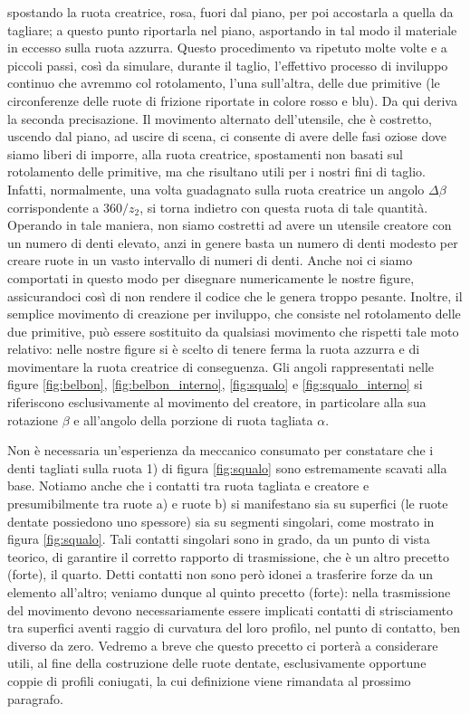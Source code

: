 spostando la ruota creatrice, rosa, fuori dal piano,
per poi accostarla a quella da tagliare; a questo punto
riportarla nel piano, asportando in tal modo il materiale in eccesso
sulla ruota azzurra. Questo procedimento va ripetuto molte volte e a 
piccoli passi, cos\`i da simulare, durante il taglio, l'effettivo
processo di inviluppo continuo che avremmo col rotolamento, l'una
sull'altra, delle due primitive (le circonferenze delle ruote di frizione
riportate in colore rosso e blu). Da qui deriva la seconda precisazione.
Il movimento alternato dell'utensile, che \`e costretto,
uscendo dal piano, ad uscire di scena,
ci consente di avere delle fasi oziose dove siamo
liberi di imporre, alla ruota creatrice, spostamenti non basati sul
rotolamento delle primitive, ma che risultano utili per i nostri fini di taglio.
Infatti, normalmente, una volta guadagnato sulla
ruota creatrice un angolo $\Delta \beta$
corrispondente a $360 /z_2$, si torna indietro con questa 
ruota di tale quantit\`a. Operando in tale maniera, non siamo
costretti ad avere un utensile creatore con un numero di denti elevato,
anzi in genere basta un numero di denti modesto per creare ruote in
un vasto intervallo di numeri di denti. Anche noi ci siamo comportati
in questo modo per disegnare numericamente le nostre figure,
assicurandoci cos\`i di non rendere il codice
che le genera troppo pesante. Inoltre, il semplice movimento di creazione
per inviluppo, che consiste nel rotolamento delle due primitive, pu\`o
essere sostituito da qualsiasi movimento che rispetti tale moto relativo:
nelle nostre figure si \`e scelto di tenere ferma la ruota azzurra e di
movimentare la ruota creatrice di conseguenza. Gli angoli rappresentati
nelle figure \ref{fig:belbon}, \ref{fig:belbon_interno}, \ref{fig:squalo} e
\ref{fig:squalo_interno} si riferiscono esclusivamente al movimento
del creatore, in particolare alla sua rotazione $\beta$ e all'angolo
della porzione di ruota tagliata $\alpha$.
 
\noindent  Non \`e necessaria un'esperienza da meccanico consumato
per constatare  che i denti tagliati sulla ruota 1) di figura \ref{fig:squalo}
sono estremamente scavati alla base.
Notiamo anche che i contatti tra ruota tagliata e creatore e presumibilmente 
tra ruote a) e ruote b) si manifestano sia su superfici (le ruote
dentate possiedono uno spessore) sia su segmenti singolari, come mostrato
in figura \ref{fig:squalo}.
Tali contatti singolari sono in grado, da un punto di vista teorico,
di garantire il corretto rapporto di trasmissione,
che \`e un altro precetto (forte), il quarto.
Detti contatti non sono per\`o idonei a trasferire forze da un elemento
all'altro;
veniamo dunque al quinto precetto (forte):
nella trasmissione del movimento devono necessariamente
essere implicati contatti di strisciamento tra superfici
aventi raggio di curvatura del loro profilo, nel punto di contatto,
 ben diverso da zero. Vedremo
a breve che questo precetto ci porter\`a a considerare utili,
al fine della costruzione delle ruote dentate, esclusivamente opportune
coppie di profili
coniugati, la cui definizione viene rimandata al prossimo paragrafo.

